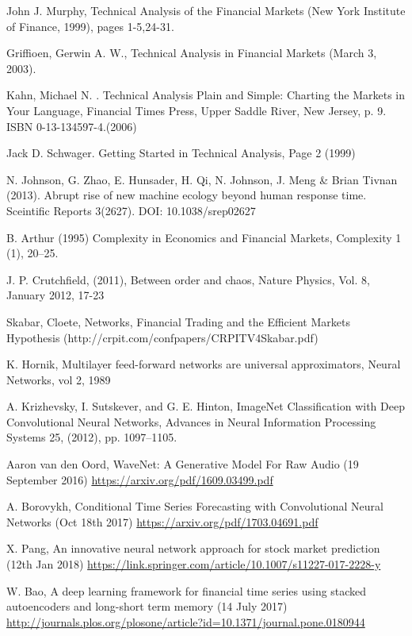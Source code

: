 \documentclass[a4paper,latin]{paper}
\begin{document}
\begin{thebibliography}{9}
John J. Murphy, Technical Analysis of the Financial Markets (New York Institute of Finance, 1999), pages 1-5,24-31.

Griffioen, Gerwin A. W., Technical Analysis in Financial Markets (March 3, 2003).

Kahn, Michael N. . Technical Analysis Plain and Simple: Charting the Markets in Your Language, Financial Times Press, Upper Saddle River, New Jersey, p. 9. ISBN 0-13-134597-4.(2006)

Jack D. Schwager. Getting Started in Technical Analysis, Page 2 (1999)

N. Johnson, G. Zhao, E. Hunsader, H. Qi, N. Johnson, J. Meng & Brian Tivnan (2013). Abrupt rise of new machine ecology beyond human response time. Sceintific Reports 3(2627). DOI: 10.1038/srep02627

B. Arthur (1995) Complexity in Economics and Financial Markets, Complexity 1 (1), 20–25.

J. P. Crutchfield, (2011), Between order and chaos, Nature Physics, Vol. 8, January 2012, 17-23

 Skabar, Cloete, Networks, Financial Trading and the Efficient Markets Hypothesis (http://crpit.com/confpapers/CRPITV4Skabar.pdf)

K. Hornik, Multilayer feed-forward networks are universal approximators, Neural Networks, vol 2, 1989

A. Krizhevsky, I. Sutskever, and G. E. Hinton, ImageNet Classification with Deep Convolutional Neural Networks, Advances in Neural Information Processing Systems 25, (2012), pp. 1097–1105.

Aaron van den Oord, WaveNet: A Generative Model For Raw Audio (19 September 2016) 
\url{https://arxiv.org/pdf/1609.03499.pdf}

A. Borovykh, Conditional Time Series Forecasting with Convolutional Neural 
Networks (Oct 18th 2017) \url {https://arxiv.org/pdf/1703.04691.pdf}

X. Pang, An innovative neural network approach for stock market prediction (12th Jan 2018) 
\url {https://link.springer.com/article/10.1007/s11227-017-2228-y}

W. Bao, A deep learning framework for financial time series using stacked autoencoders and long-short term memory 
(14 July 2017) \url {http://journals.plos.org/plosone/article?id=10.1371/journal.pone.0180944}


\end{thebibliography}
\end{document}
